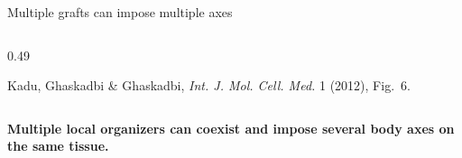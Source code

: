 \begin{frame}{Multiple grafts can impose multiple axes}
\begin{columns}[T,onlytextwidth]
\begin{column}{0.49\textwidth}
      {\color{HydraMuted}\fontsize{6}{7.2}\selectfont
        Kadu, Ghaskadbi \& Ghaskadbi,
        \textit{Int. J. Mol. Cell. Med.} 1 (2012), Fig.~6.\par}

    \end{column}

  \end{columns}

  \vspace{0.20cm}

  \begin{center}
    \begin{minipage}{0.78\textwidth}
      \centering
      {\color{HydraGold}\bfseries\fontsize{9.0}{11.2}\selectfont
        Multiple local organizers can coexist and impose
        several body axes on the same tissue.\par}
    \end{minipage}
  \end{center}

\end{frame}





